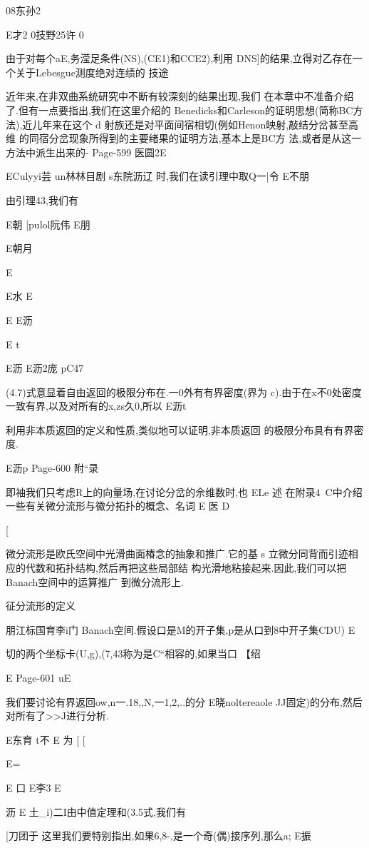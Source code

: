 {{08东孙2

E才2
0技野25许
0

由于对每个aE,务滢足条件(NS),(CE1)和CCE2),利用
DNS]的结果,立得对乙存在一个关于Lebesgue测度绝对连绩的
技途

近年来,在非双曲系统研究中不断有较深刻的结果出现,我们
在本章中不准备介绍了.但有一点要指出,我们在这里介绍的
Benedicks和Carleson的证明思想(简称BC方法),近儿年来在这个
d
射族还是对平面间宿相切(例如Henon映射,敲结分岔甚至高维
的同宿分岔现象所得到的主要绪果的证明方法,基本上是BC方
法,或者是从这一方法中派生出来的-
Page-599
医圆2E

ECulyyi芸
un林林目剧
s东院沥辽
时,我们在读引理中取Q一|令
E不朋

由引理43,我们有

E朝
[pulol阮伟
E朋

E朝月

E

E水
E

E
E沥

E
t

E沥
E沥2庞
pC47

(4.7)式意显着自由返回的极限分布在.一0外有有界密度(界为
c).由于在x不0处密度一致有界,以及对所有的x,zs久0,所以
E沥t

利用非本质返回的定义和性质,类似地可以证明,非本质返回
的极限分布具有有界密度.

E沥p
Page-600
附“录

即袖我们只考虑R上的向量场,在讨论分岔的佘维数时,也
ELe
述
在附录4~C中介绍一些有关微分流形与徽分拓扑的概念、名词
E
医
D

[

微分流形是欧氏空间中光滑曲面椿念的抽象和推广.它的基
s
立微分同背而引迹相应的代数和拓扑结构,然后再把这些局部结
构光滑地粘接起来.因此,我们可以把Banach空间中的运算推广
到微分流形上.

征分流形的定义

朋江标国育李i门
Banach空间.假设口是M的开子集,p是从口到8中开子集CDU)
E

切的两个坐标卡(U,g),(7,43称为是C“相容的,如果当口
【绍

E
Page-601
uE

我们要讨论有界返回{ow},n一.18,,N,一1,2,..的分
E晓noltereaole
JJ固定)的分布,然后对所有了>>J进行分析.

E东育
t不
E
为
[
[

E={

E
口
E李3
E

沥
E
土_i)二I由中值定理和(3.5式,我们有

[刀团于
这里我们要特别指出,如果{6,}8-,是一个奇(偶)接序列,那么a;
E振

}}}
